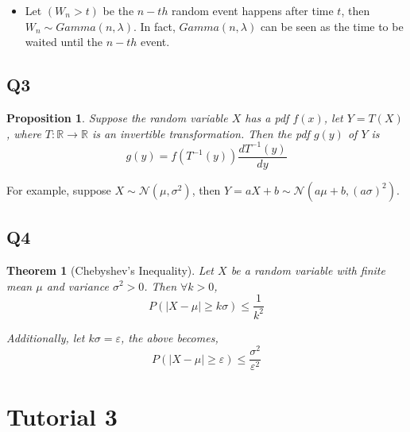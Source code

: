 \documentclass[
]{book}
\providecommand{\tightlist}{%
  \setlength{\itemsep}{0pt}\setlength{\parskip}{0pt}}
\newtheorem{theorem}{Theorem}[chapter]
\newtheorem{proposition}{Proposition}[chapter]
\theoremstyle{definition}
\theoremstyle{definition}
\theoremstyle{definition}
\theoremstyle{remark}
\begin{document}
\begin{itemize}
\tightlist
\item
  Let \((W_n>t)\) be the \(n-th\) random event happens after time \(t\), then \(W_n\sim Gamma(n, \lambda)\). In fact, \(Gamma(n,\lambda)\) can be seen as the time to be waited until the \(n-th\) event.
\end{itemize}

\hypertarget{q3-1}{%
\section{Q3}\label{q3-1}}

\begin{proposition}
\protect\hypertarget{prp:unnamed-chunk-2}{}{\label{prp:unnamed-chunk-2} }Suppose the random variable \(X\) has a pdf \(f(x)\), let \(Y = T(X)\), where \(T:\mathbb{R}\rightarrow \mathbb{R}\) is an invertible transformation. Then the pdf \(g(y)\) of \(Y\) is
\begin{equation*}
g(y) = f(T^{-1}(y))\frac{d T^{-1}(y)}{dy}
\end{equation*}
\end{proposition}

For example, suppose \(X\sim\mathcal{N}(\mu,\sigma^2)\), then \(Y=aX+b\sim\mathcal{N}(a\mu+b, (a\sigma)^2)\).

\hypertarget{q4}{%
\section{Q4}\label{q4}}

\begin{theorem}[Chebyshev's Inequality]
\protect\hypertarget{thm:unnamed-chunk-3}{}{\label{thm:unnamed-chunk-3} \iffalse (Chebyshev's Inequality) \fi{} }Let \(X\) be a random variable with finite mean \(\mu\) and variance \(\sigma^2>0\). Then \(\forall k>0\),
\begin{equation*}
P(|X-\mu|\geq k\sigma) \leq \frac{1}{k^2}
\end{equation*}

Additionally, let \(k\sigma = \varepsilon\), the above becomes,
\begin{equation*}
P(|X-\mu|\geq \varepsilon) \leq \frac{\sigma^2}{\varepsilon^2}
\end{equation*}
\end{theorem}

\hypertarget{tutorial-3}{%
\chapter{Tutorial 3}\label{tutorial-3}}
\end{document}
